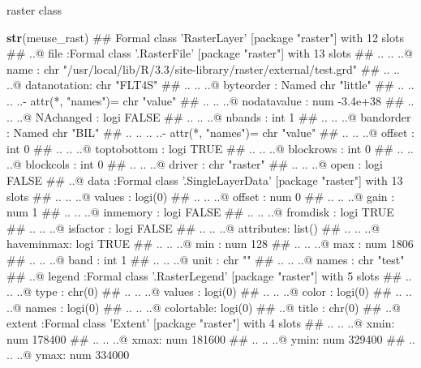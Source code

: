 \documentclass[11pt,ignorenonframetext,]{beamer}
\newenvironment{Shaded}{}{}
\newcommand{\KeywordTok}[1]{\textcolor[rgb]{0.00,0.44,0.13}{\textbf{#1}}}
\newcommand{\NormalTok}[1]{#1}
\let\oldShaded\Shaded
\let\endoldShaded\endShaded
\renewenvironment{Shaded}{\footnotesize\begin{spacing}{0.9}\oldShaded}{\endoldShaded\end{spacing}}
\begin{document}
\begin{frame}[fragile]{raster class}

\begin{Shaded}
\begin{Highlighting}[]
\KeywordTok{str}\NormalTok{(meuse_rast)}
\NormalTok{## Formal class 'RasterLayer' [package "raster"] with 12 slots}
\NormalTok{##   ..@ file    :Formal class '.RasterFile' [package "raster"] with 13 slots}
\NormalTok{##   .. .. ..@ name        : chr "/usr/local/lib/R/3.3/site-library/raster/external/test.grd"}
\NormalTok{##   .. .. ..@ datanotation: chr "FLT4S"}
\NormalTok{##   .. .. ..@ byteorder   : Named chr "little"}
\NormalTok{##   .. .. .. ..- attr(*, "names")= chr "value"}
\NormalTok{##   .. .. ..@ nodatavalue : num -3.4e+38}
\NormalTok{##   .. .. ..@ NAchanged   : logi FALSE}
\NormalTok{##   .. .. ..@ nbands      : int 1}
\NormalTok{##   .. .. ..@ bandorder   : Named chr "BIL"}
\NormalTok{##   .. .. .. ..- attr(*, "names")= chr "value"}
\NormalTok{##   .. .. ..@ offset      : int 0}
\NormalTok{##   .. .. ..@ toptobottom : logi TRUE}
\NormalTok{##   .. .. ..@ blockrows   : int 0}
\NormalTok{##   .. .. ..@ blockcols   : int 0}
\NormalTok{##   .. .. ..@ driver      : chr "raster"}
\NormalTok{##   .. .. ..@ open        : logi FALSE}
\NormalTok{##   ..@ data    :Formal class '.SingleLayerData' [package "raster"] with 13 slots}
\NormalTok{##   .. .. ..@ values    : logi(0) }
\NormalTok{##   .. .. ..@ offset    : num 0}
\NormalTok{##   .. .. ..@ gain      : num 1}
\NormalTok{##   .. .. ..@ inmemory  : logi FALSE}
\NormalTok{##   .. .. ..@ fromdisk  : logi TRUE}
\NormalTok{##   .. .. ..@ isfactor  : logi FALSE}
\NormalTok{##   .. .. ..@ attributes: list()}
\NormalTok{##   .. .. ..@ haveminmax: logi TRUE}
\NormalTok{##   .. .. ..@ min       : num 128}
\NormalTok{##   .. .. ..@ max       : num 1806}
\NormalTok{##   .. .. ..@ band      : int 1}
\NormalTok{##   .. .. ..@ unit      : chr ""}
\NormalTok{##   .. .. ..@ names     : chr "test"}
\NormalTok{##   ..@ legend  :Formal class '.RasterLegend' [package "raster"] with 5 slots}
\NormalTok{##   .. .. ..@ type      : chr(0) }
\NormalTok{##   .. .. ..@ values    : logi(0) }
\NormalTok{##   .. .. ..@ color     : logi(0) }
\NormalTok{##   .. .. ..@ names     : logi(0) }
\NormalTok{##   .. .. ..@ colortable: logi(0) }
\NormalTok{##   ..@ title   : chr(0) }
\NormalTok{##   ..@ extent  :Formal class 'Extent' [package "raster"] with 4 slots}
\NormalTok{##   .. .. ..@ xmin: num 178400}
\NormalTok{##   .. .. ..@ xmax: num 181600}
\NormalTok{##   .. .. ..@ ymin: num 329400}
\NormalTok{##   .. .. ..@ ymax: num 334000}

\end{Highlighting}
\end{Shaded}
\end{frame}
\end{document}
